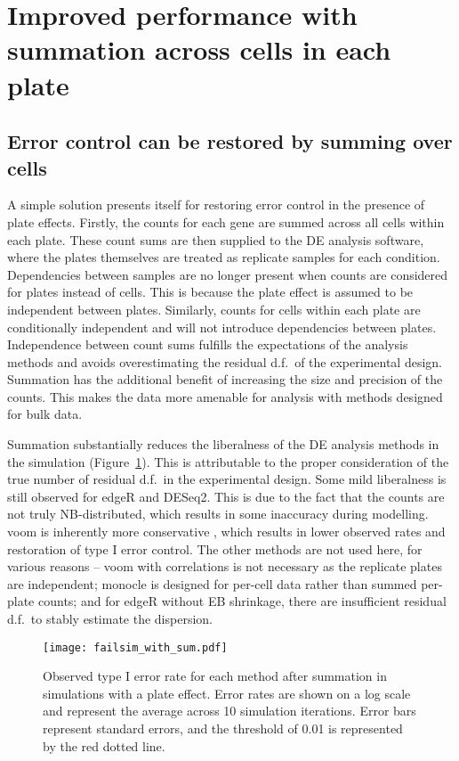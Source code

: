 \documentclass{article}
\begin{document}
\section{Improved performance with summation across cells in each plate}

\subsection{Error control can be restored by summing over cells}
A simple solution presents itself for restoring error control in the presence of plate effects.
Firstly, the counts for each gene are summed across all cells within each plate.
These count sums are then supplied to the DE analysis software, where the plates themselves are treated as replicate samples for each condition.
Dependencies between samples are no longer present when counts are considered for plates instead of cells.
This is because the plate effect is assumed to be independent between plates. 
Similarly, counts for cells within each plate are conditionally independent and will not introduce dependencies between plates.
Independence between count sums fulfills the expectations of the analysis methods and avoids overestimating the residual d.f.\ of the experimental design.
Summation has the additional benefit of increasing the size and precision of the counts.
This makes the data more amenable for analysis with methods designed for bulk data.

Summation substantially reduces the liberalness of the DE analysis methods in the simulation (Figure~\ref{fig:platesum}).
This is attributable to the proper consideration of the true number of residual d.f.\ in the experimental design.
Some mild liberalness is still observed for edgeR and DESeq2.
This is due to the fact that the counts are not truly NB-distributed, which results in some inaccuracy during modelling.
voom is inherently more conservative \cite{law2014voom}, which results in lower observed rates and restoration of type I error control.
The other methods are not used here, for various reasons -- voom with correlations is not necessary as the replicate plates are independent;
    monocle is designed for per-cell data rather than summed per-plate counts;
    and for edgeR without EB shrinkage, there are insufficient residual d.f.\ to stably estimate the dispersion.

\begin{figure}[tbp]
\begin{center}
\texttt{[image: failsim\_with\_sum.pdf]}
\end{center}
\caption{
    Observed type I error rate for each method after summation in simulations with a plate effect.
    Error rates are shown on a log scale and represent the average across 10 simulation iterations.
    Error bars represent standard errors, and the threshold of 0.01 is represented by the red dotted line.
}
\label{fig:platesum}
\end{figure}
\end{document}
